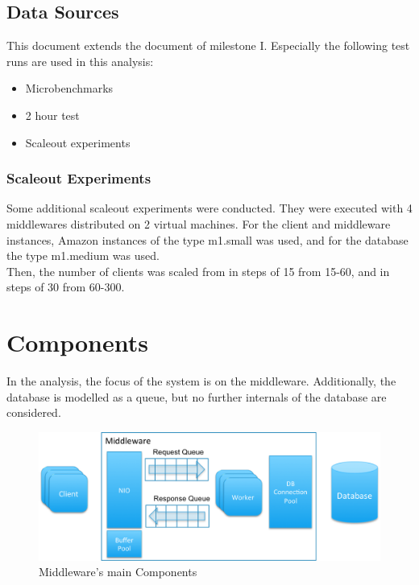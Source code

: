 \documentclass[a4paper]{article}
\begin{document}
\subsection{Data Sources}

This document extends the document of milestone I. Especially the following test runs are used in this analysis:

\begin{itemize}
\item Microbenchmarks
\item 2 hour test
\item Scaleout experiments
\end{itemize}

\subsubsection{Scaleout Experiments}

Some additional scaleout experiments were conducted. They were executed with 4 middlewares distributed on 2 virtual machines. For the client and middleware instances, Amazon instances of the type m1.small was used, and for the database the type m1.medium was used.\\
\noindent Then, the number of clients was scaled from in steps of 15 from 15-60, and in steps of 30 from 60-300.


\section{Components}

In the analysis, the focus of the system is on the middleware. Additionally, the database is modelled as a queue, but no further internals of the database are considered.\\

\begin{figure}[H]
	\begin{center}
    \includegraphics[scale=0.6]{../drawings/broker-threading.png}
  \end{center}
  \caption{Middleware's main Components}
  \label{fig:middleware-threading}
\end{figure}
\end{document}
